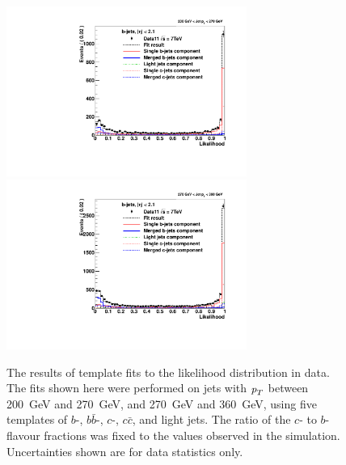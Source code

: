 \begin{figure}[tp]
\centering
\includegraphics[width=0.7\textwidth]{FIGS/Fits/LikelihoodFit_3param_ETAFull_Bin5.pdf}
\includegraphics[width=0.7\textwidth]{FIGS/Fits/LikelihoodFit_3param_ETAFull_Bin6.pdf}
\caption{The results of template fits to the likelihood distribution in data. The fits shown here were performed on jets with ${\emph{p}_{T}}$ between  200~GeV and 270~GeV, and 270~GeV and 360~GeV, using five templates of $b$-, $b\bar{b}$-, $c$-, $c\bar{c}$, and light jets.  The ratio of the $c$- to $b$-flavour fractions was fixed to the values observed in the simulation.  Uncertainties shown are for data statistics only.}
\label{fig:fittemplates2}
\end{figure}

